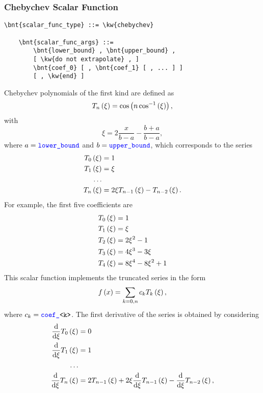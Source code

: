 \subsubsection{Chebychev Scalar Function}
\begin{Verbatim}[commandchars=\\\{\}]
    \bnt{scalar_func_type} ::= \kw{chebychev}

    \bnt{scalar_func_args} ::= 
        \bnt{lower_bound} , \bnt{upper_bound} ,
        [ \kw{do not extrapolate} , ]
        \bnt{coef_0} [ , \bnt{coef_1} [ , ... ] ]
        [ , \kw{end} ]
\end{Verbatim}
Chebychev polynomials of the first kind are defined as
\begin{equation}
	T_n\left( \xi \right) = \cos\left( n \cos^{-1}\left( \xi \right) \right) ,
\end{equation}
with
\begin{equation}
	\xi = 2 \frac{x}{b - a} - \frac{b + a}{b - a} ,
\end{equation}
where $a = \textcolor{blue}{\texttt{lower\_bound}}$ and $b = \textcolor{blue}{\texttt{upper\_bound}}$,
which corresponds to the series
\begin{align}
	T_0\left( \xi \right) &= 1 \\
	T_1\left( \xi \right) &= \xi \\
	\ldots \nonumber \\
	T_n\left( \xi \right) &= 2 \xi T_{n-1}\left( \xi \right) - T_{n-2}\left( \xi \right) .
\end{align}
For example, the first five coefficients are
\begin{align}
	T_0\left( \xi \right) &= 1 \\
	T_1\left( \xi \right) &= \xi \\
	T_2\left( \xi \right) &= 2\xi^2 - 1 \\
	T_3\left( \xi \right) &= 4\xi^3 - 3\xi \\
	T_4\left( \xi \right) &= 8\xi^4 - 8\xi^2 + 1
\end{align}
This scalar function implements the truncated series in the form
\begin{equation}
	f\left( x \right) = \sum_{k=0,n} c_k T_k\left( \xi \right) ,
\end{equation}
where $c_k = \textcolor{blue}{\texttt{coef\_}}\texttt{<k>}$.
The first derivative of the series is obtained by considering
\begin{align}
	\frac{\mathrm{d}}{\mathrm{d}\xi}T_0\left( \xi \right) &= 0 \\
	\frac{\mathrm{d}}{\mathrm{d}\xi}T_1\left( \xi \right) &= 1 \\
	\ldots \nonumber \\
	\frac{\mathrm{d}}{\mathrm{d}\xi}T_n\left( \xi \right) &= 
		2 T_{n-1}\left( \xi \right)
		+ 2 \xi \frac{\mathrm{d}}{\mathrm{d}\xi}T_{n-1}\left( \xi \right)
		- \frac{\mathrm{d}}{\mathrm{d}\xi}T_{n-2}\left( \xi \right) ,
\end{align}
